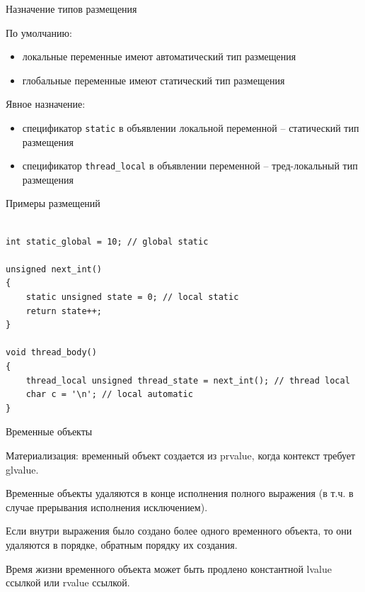 \documentclass[unknownkeysallowed,xcolor=table]{beamer}
\begin{document}
\begin{frame}{Назначение типов размещения}

По умолчанию:
\begin{itemize}
  \item локальные переменные имеют автоматический тип размещения \vspace{0.5em}
  \item глобальные переменные имеют статический тип размещения
\end{itemize}

\vspace{2em}

Явное назначение:
\begin{itemize}
  \item спецификатор \lstinline{static} в объявлении локальной переменной -- статический тип размещения \vspace{0.5em}
  \item спецификатор \lstinline{thread_local} в объявлении переменной -- тред-локальный тип размещения
\end{itemize}

\end{frame}

\begin{frame}[fragile]{Примеры размещений}
\begin{lstlisting}[basicstyle=\ttfamily\small]

int static_global = 10; // global static

unsigned next_int()
{
    static unsigned state = 0; // local static
    return state++;
}

void thread_body()
{
    thread_local unsigned thread_state = next_int(); // thread local
    char c = '\n'; // local automatic
}

\end{lstlisting}
\end{frame}

\begin{frame}{Временные объекты}

Материализация: временный объект создается из prvalue, когда контекст требует glvalue. \vspace{1.5em}

Временные объекты удаляются в конце исполнения полного выражения (в т.ч. в случае прерывания исполнения исключением). \vspace{1.5em}

Если внутри выражения было создано более одного временного объекта, то они удаляются в порядке, обратным порядку их создания. \vspace{1.5em}

Время жизни временного объекта может быть продлено константной lvalue ссылкой или rvalue ссылкой. \vspace{1.5em}

\end{frame}
\end{document}

